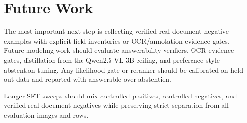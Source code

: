 \section{Future Work}

The most important next step is collecting verified real-document negative
examples with explicit field inventories or OCR/annotation evidence gates.
Future modeling work should evaluate answerability verifiers, OCR evidence
gates, distillation from the Qwen2.5-VL 3B ceiling, and preference-style
abstention tuning. Any likelihood gate or reranker should be calibrated on held
out data and reported with answerable over-abstention.

Longer SFT sweeps should mix controlled positives, controlled negatives, and
verified real-document negatives while preserving strict separation from all
evaluation images and rows.
